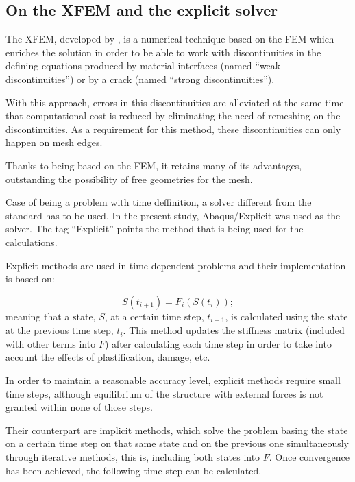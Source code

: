\documentclass[
documentsize = a4, %
font = cmr, %
typesize = 11, %
printmode = true,
onehalfspacing = true,
language = en, %
titlepage = udciccp, %
degree = pt, %
dedication = true,
acknowledgements = true,
abstract-en = true,
abstract-es = false,
abstract-ga = false,
epigraphs = true,
toc = true,
lof = true,
lot = true,
frontmatterintoc = false,
notation = false,
minimal = false,
]{UDCthesis}
\begin{document}
\subsection{On the \acrlong{XFEM} and the explicit solver}
\label{sec:xfem}

The \gls{XFEM}, developed by \citet{Moes1999}, is a numerical technique based on the \gls{FEM} which enriches the solution in order to be able to work with discontinuities in the defining equations produced by material interfaces (named ``weak discontinuities'') or by a crack (named ``strong discontinuities'').

With this approach, errors in this discontinuities are alleviated at the same time that computational cost is reduced by eliminating the need of remeshing on the discontinuities. As a requirement for this method, these discontinuities can only happen on mesh edges.

Thanks to being based on the \gls{FEM}, it retains many of its advantages, outstanding the possibility of free geometries for the mesh.

Case of being a problem with time deffinition, a solver different from the standard has to be used. In the present study, Abaqus/Explicit was used as the solver. The tag ``Explicit'' points the method that is being used for the calculations.

Explicit methods are used in time-dependent problems and their implementation is based on:

\begin{equation}
S\left(t_{i+1}\right) = F_{i}\left(S\left(t_{i}\right)\right) ;
\label{eq:explicit}
\end{equation}
meaning that a state, $S$, at a certain time step, $t_{i+1}$, is calculated using the state at the previous time step, $t_{i}$. This method updates the stiffness matrix (included with other terms into $F$) after calculating each time step in order to take into account the effects of plastification, damage, etc.

In order to maintain a reasonable accuracy level, explicit methods require small time steps, although equilibrium of the structure with external forces is not granted within none of those steps.

Their counterpart are implicit methods, which solve the problem basing the state on a certain time step on that same state and on the previous one simultaneously through iterative methods, this is, including both states into $F$. Once convergence has been achieved, the following time step can be calculated.
\end{document}
